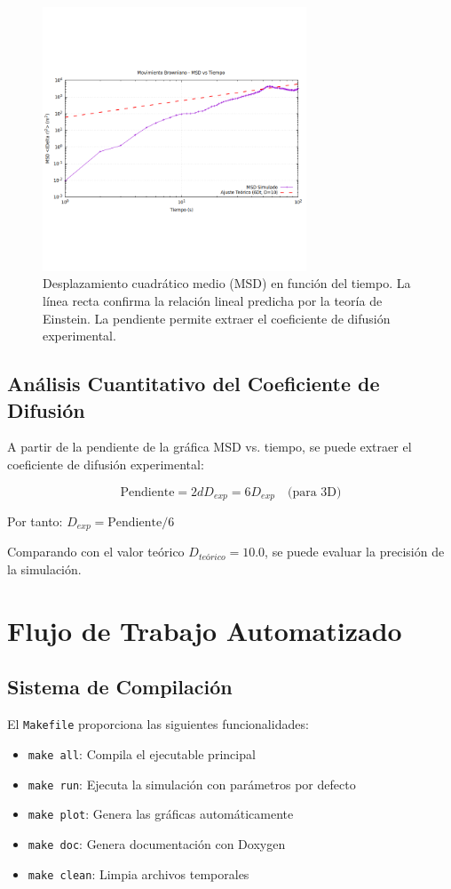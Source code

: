 \documentclass[11pt,a4paper]{article}
\begin{document}
\begin{figure}[h!]
    \centering
    \includegraphics[width=0.7\textwidth]{../results/browniano_sim_plot_msd_vs_t.png}
    \caption{Desplazamiento cuadrático medio (MSD) en función del tiempo. La línea recta confirma la relación lineal predicha por la teoría de Einstein. La pendiente permite extraer el coeficiente de difusión experimental.}
    \label{fig:msd}
\end{figure}

\subsection{Análisis Cuantitativo del Coeficiente de Difusión}
A partir de la pendiente de la gráfica MSD vs. tiempo, se puede extraer el coeficiente de difusión experimental:

\begin{equation}
    \text{Pendiente} = 2dD_{exp} = 6D_{exp} \quad \text{(para 3D)}
\end{equation}

Por tanto: $D_{exp} = \text{Pendiente}/6$

Comparando con el valor teórico $D_{teórico} = 10.0$, se puede evaluar la precisión de la simulación.

\section{Flujo de Trabajo Automatizado}

\subsection{Sistema de Compilación}
El \texttt{Makefile} proporciona las siguientes funcionalidades:
\begin{itemize}
    \item \texttt{make all}: Compila el ejecutable principal
    \item \texttt{make run}: Ejecuta la simulación con parámetros por defecto
    \item \texttt{make plot}: Genera las gráficas automáticamente
    \item \texttt{make doc}: Genera documentación con Doxygen
    \item \texttt{make clean}: Limpia archivos temporales
\end{itemize}
\end{document}
